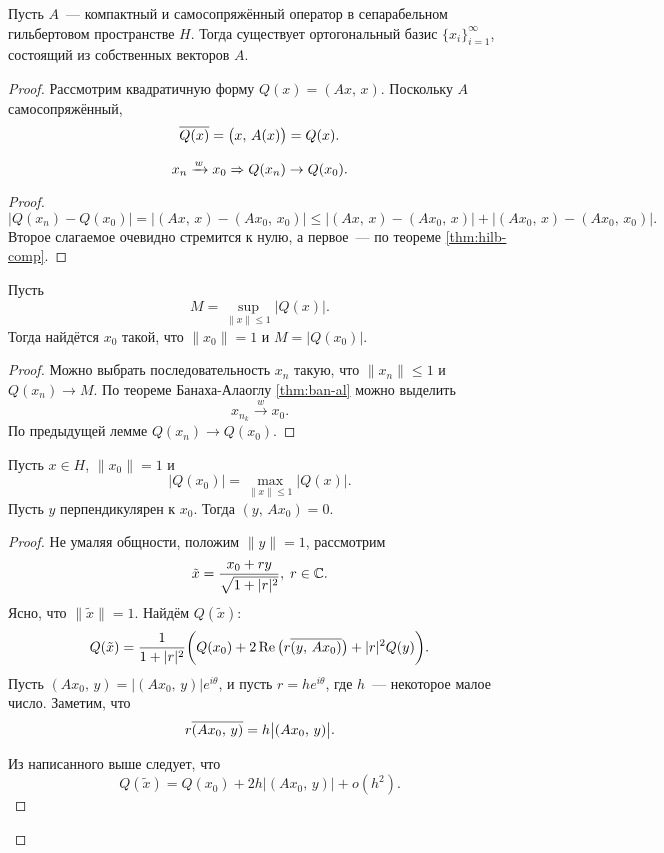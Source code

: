 \documentclass{notes}
\DeclareMathOperator{\re}{Re}
\newcommand{\weak}{\xrightarrow{w}}
\begin{document}
	\begin{thm}
		Пусть $A$~--- компактный и самосопряжённый оператор в сепарабельном гильбертовом пространстве $H$. Тогда существует ортогональный базис $\{x_i\}_{i = 1}^{\infty}$, состоящий из собственных векторов $A$.
		\begin{proof}
			Рассмотрим квадратичную форму $Q(x) = (Ax, \, x)$. Поскольку $A$ самосопряжённый, 
			\[
				\overline{Q(x)} = \big(x, \, A(x)\big) = Q(x).
			\]
			\begin{lm}
				\[
					x_n \weak x_0 \so Q(x_n) \to Q(x_0).
				\]
				\begin{proof}
					\[
						\big|Q(x_n) - Q(x_0)\big| = \big|(Ax, \, x) - (Ax_0, \, x_0)\big| \leqslant  \big|(Ax, \, x) - (Ax_0, \, x)\big| + \big|(Ax_0, \, x) - (Ax_0, \, x_0)\big|.
					\]
					Второе слагаемое очевидно стремится к нулю, а первое~--- по теореме \ref{thm:hilb-comp}.
				\end{proof}
			\end{lm}

			\begin{lm}
				Пусть 
				\[
					M = \sup\limits_{\|x\| \leqslant 1} \big|Q(x)\big|.
				\]
				Тогда найдётся $x_0$ такой, что $\|x_0\| = 1$ и $M = |Q(x_0)|$.
				\begin{proof}
					Можно выбрать последовательность $x_n$ такую, что $\|x_n\| \leqslant 1$ и $Q(x_n) \to M$. По теореме Банаха-Алаоглу \ref{thm:ban-al} можно выделить
					\[
						x_{n_k} \weak x_0.
					\]
					По предыдущей лемме $Q(x_n) \to Q(x_0)$.
				\end{proof}
			\end{lm}

			\begin{lm} \label{lm:hil-sch-3}
				Пусть $x \in H$, $\|x_0\| = 1$ и 
				\[
					\big|Q(x_0)\big| = \max\limits_{\|x\| \leqslant 1} \big|Q(x)\big|.
				\]
				Пусть $y$ перпендикулярен к $x_0$. Тогда $(y, \, Ax_0) = 0$.
				\begin{proof}
					Не умаляя общности, положим $\|y\| = 1$, рассмотрим
					\[
						\tilde{x} = \dfrac{x_0 + ry}{\sqrt{1 + |r|^2}}, \; r \in \mathbb{C}.
					\]
					Ясно, что $\|\tilde{x}\| = 1$. Найдём $Q(\tilde{x})$:
					\[
						Q(\tilde{x}) = \dfrac{1}{1 + |r|^2} \bigg(Q(x_0) + 2 \re\big(r \ov{(y, \, Ax_0)}\big) + |r|^2 Q(y)\bigg).
					\]
					Пусть $(Ax_0, \, y) = \big|(Ax_0, \, y)\big| e^{i\theta}$, и пусть $r = he^{i\theta}$, где $h$~--- некоторое малое число. Заметим, что
					\[
						r \overline{(Ax_0, \, y)} = h \big|(Ax_0, \, y)\big|.
					\]

					Из написанного выше следует, что
					\[
						Q(\tilde{x}) = Q(x_0) + 2h \left|(Ax_0, \, y)\right| + o(h^2).
					\]


\end{proof}
\end{lm}
\end{proof}
\end{thm}
\end{document}
